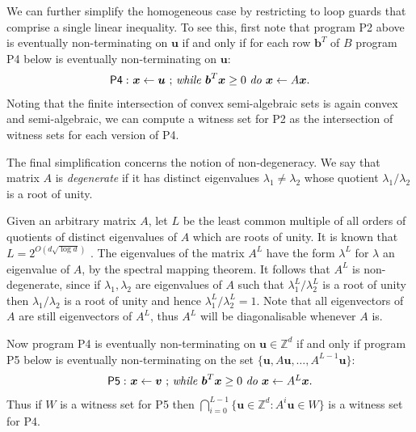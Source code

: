 We can further simplify the homogeneous case by restricting to loop
guards that comprise a single linear inequality.  To see this, first
note that program \textsf{P2} above is eventually non-terminating on
$\boldsymbol{u}$ if and only if for each row $\boldsymbol{b}^T$ of $B$
program \textsf{P4} below is eventually non-terminating on
$\boldsymbol{u}$:
\begin{gather*}
\mathsf{P4:}\ \mbox{$\boldsymbol{x}\gets \boldsymbol{u}$ ;
\textit{while} $\boldsymbol{b}^T\boldsymbol{x} \geq 0$ \textit{do} $\boldsymbol{x}\leftarrow A\boldsymbol{x}$.}
\end{gather*}
Noting that the finite intersection of convex semi-algebraic sets is
again convex and semi-algebraic, we can compute a witness set
for \textsf{P2} as the intersection of witness sets for each version
of \textsf{P4}.

The final simplification concerns the notion of
non-degeneracy.  We say that matrix $A$ is \emph{degenerate} if it has
distinct eigenvalues $\lambda_1 \neq \lambda_2$ whose quotient
$\lambda_1/\lambda_2$ is a root of unity.

Given an arbitrary matrix $A$, let $L$ be the least common multiple of all orders of quotients of distinct eigenvalues of $A$ which are roots
of unity. It is known that $L=2^{O(d\sqrt{\log d})}$ \cite{BOOK}.  The
eigenvalues of the matrix $A^L$ have the form $\lambda^L$ for
$\lambda$ an eigenvalue of $A$, by the spectral mapping theorem.  It follows that
$A^L$ is non-degenerate, since if $\lambda_1,\lambda_2$ are
eigenvalues of $A$ such that $\lambda^L_1/\lambda^L_2$ is a root of
unity then $\lambda_1/\lambda_2$ is a root of unity and hence
$\lambda^L_1/\lambda^L_2=1$. Note that all eigenvectors of $A$ are still eigenvectors of $A^L$, thus $A^L$ will be diagonalisable whenever $A$ is.

Now program \textsf{P4} is eventually non-terminating on
$\boldsymbol{u}\in \mathbb{Z}^d$ if and only if program \textsf{P5}
below is eventually non-terminating on the set
$\{\boldsymbol{u},A\boldsymbol{u}, \ldots,A^{L-1}\boldsymbol{u}\}$:
\begin{gather*}
\mathsf{P5:}\ \mbox{$\boldsymbol{x}\gets \boldsymbol{v}$ ;
\textit{while} $\boldsymbol b^T\boldsymbol{x} \geq 0$ \textit{do} $\boldsymbol{x}\leftarrow A^L\boldsymbol{x}$.}
\end{gather*}
Thus if $W$ is a witness set for \textsf{P5} then $\bigcap_{i=0}^{L-1}
\{ \boldsymbol{u} \in \mathbb{Z}^d : A^i\boldsymbol{u} \in W\}$ is a witness set for
\textsf{P4}.

